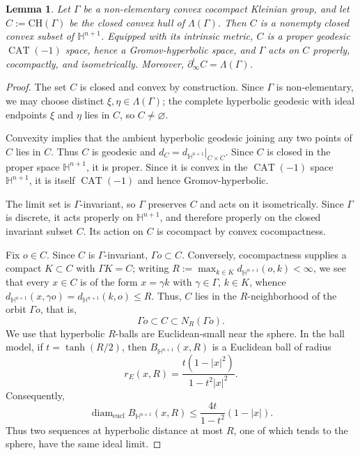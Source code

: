 \documentclass[12pt,oneside,a4paper]{article}
\theoremstyle{mytheorem}
\newtheorem{lemma}[definition]{Lemma}
\theoremstyle{remark}
\theoremstyle{definition}
\begin{document}
\begin{lemma}\label{lem:hull}
Let \(\Gamma\) be a non-elementary convex cocompact Kleinian group, and let
$ C:=\mathrm{CH}(\Gamma)$
be the closed convex hull of \(\Lambda(\Gamma)\).  Then \(C\) is a
nonempty closed convex subset of \(\mathbb H^{n+1}\).  Equipped with its
intrinsic metric, \(C\) is a proper geodesic
\(\operatorname{CAT}(-1)\) space, hence a Gromov-hyperbolic space, and
\(\Gamma\) acts on \(C\) properly, cocompactly, and isometrically.
Moreover, \(\partial_\infty^{i}C=\Lambda(\Gamma)\).
\end{lemma}

\begin{proof}
The set \(C\) is closed and convex by construction.  Since \(\Gamma\) is
non-elementary, we may choose distinct \(\xi,\eta\in\Lambda(\Gamma)\);
the complete hyperbolic geodesic with ideal endpoints \(\xi\) and \(\eta\)
lies in \(C\), so
\(C\neq\varnothing\).

Convexity implies that the ambient hyperbolic geodesic joining any two
points of \(C\) lies in \(C\).  Thus \(C\) is geodesic and
$d_C=d_{\mathbb H^{n+1}}\big|_{C\times C}.$
Since \(C\) is closed in the proper space \(\mathbb H^{n+1}\), it is
proper.  Since it is convex in the \(\operatorname{CAT}(-1)\) space
\(\mathbb H^{n+1}\), it is itself \(\operatorname{CAT}(-1)\) and hence
Gromov-hyperbolic.  

The limit set is \(\Gamma\)-invariant, so \(\Gamma\) preserves \(C\) and
acts on it isometrically.  Since \(\Gamma\) is discrete, it acts
properly on \(\mathbb H^{n+1}\), and therefore properly on the closed
invariant subset \(C\).  Its action on \(C\) is cocompact by convex
cocompactness.

Fix \(o\in C\).  Since \(C\) is \(\Gamma\)-invariant, \(\Gamma o\subset C\).
Conversely, cocompactness supplies a compact \(K\subset C\) with
\(\Gamma K=C\); writing \(R:=\max_{k\in K}d_{\mathbb H^{n+1}}(o,k)<\infty\),
we see that every \(x\in C\) is of the form \(x=\gamma k\) with \(\gamma\in\Gamma\),
\(k\in K\), whence
\(d_{\mathbb H^{n+1}}(x,\gamma o)=d_{\mathbb H^{n+1}}(k,o)\leq R\).  Thus, $C$ lies in the $R$-neighborhood of the orbit $\Gamma o$, that is,
\begin{equation}\label{eq:orbit-coarse-dense}
\Gamma o\subset C\subset N_R(\Gamma o).
\end{equation}
We use that hyperbolic \(R\)-balls are Euclidean-small near the sphere. In
the ball model, if \(t=\tanh(R/2)\), then
\(B_{\mathbb H^{n+1}}(x,R)\) is a Euclidean ball of radius
\[
 r_E(x,R)=\frac{t(1-|x|^2)}{1-t^2|x|^2}.
\]
Consequently,
\[
\operatorname{diam}_{\mathrm{eucl}}B_{\mathbb H^{n+1}}(x,R)
\leq\frac{4t}{1-t^2}(1-|x|).
\]
Thus two sequences at hyperbolic distance at most \(R\), one of which tends
to the sphere, have the same ideal limit.


\end{proof}
\end{document}
